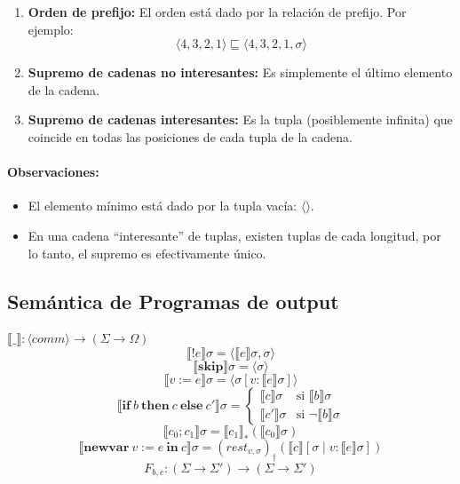 \documentclass[a4paper,11pt]{article}
\begin{document}
\begin{enumerate}
    \item \textbf{Orden de prefijo:} El orden está dado por la relación de prefijo. Por ejemplo:
    \[
    \langle 4, 3, 2, 1 \rangle \sqsubseteq \langle 4, 3, 2, 1, \sigma \rangle
    \]

    \item \textbf{Supremo de cadenas no interesantes:} Es simplemente el último elemento de la cadena.

    \item \textbf{Supremo de cadenas interesantes:} Es la tupla (posiblemente infinita) que coincide en todas las posiciones de cada tupla de la cadena.
\end{enumerate}

\paragraph{Observaciones:}
\begin{itemize}
    \item El elemento mínimo está dado por la tupla vacía: $\langle \rangle$.
    \item En una cadena ``interesante'' de tuplas, existen tuplas de cada longitud, por lo tanto, el supremo es efectivamente único.
\end{itemize}

\subsection{Semántica de Programas de output}
$\llbracket \_ \rrbracket : \langle comm \rangle \to (\Sigma \to \Omega)$
\[
\llbracket !e \rrbracket \sigma = \langle \llbracket e \rrbracket \sigma, \sigma \rangle
\]
    \[
    \llbracket \mathbf{skip} \rrbracket \sigma = \langle \sigma \rangle
    \]
    \[
    \llbracket v := e \rrbracket \sigma = \langle \sigma [v : \llbracket e \rrbracket \sigma] \rangle
    \]
    \[
    \llbracket \mathbf{if} \ b \ \mathbf{then} \ c \ \mathbf{else} \ c' \rrbracket \sigma =
    \begin{cases}
        \llbracket c \rrbracket \sigma & \text{si } \llbracket b \rrbracket \sigma \\
        \llbracket c' \rrbracket \sigma & \text{si } \neg \llbracket b \rrbracket \sigma
    \end{cases}
    \]
    \[
    \llbracket c_0; c_1 \rrbracket \sigma =
    \llbracket c_1 \rrbracket_{*} (\llbracket c_0 \rrbracket \sigma)
    \]
    \[
    \llbracket \mathbf{newvar} \ v := e \ \mathbf{in} \ c \rrbracket \sigma =
    (rest_{v,\sigma})_{\dagger} \left( \llbracket c \rrbracket [\sigma \mid v : \llbracket e \rrbracket \sigma] \right)
    \]
\[
F_{b,c} : (\Sigma \to \Sigma') \to (\Sigma \to \Sigma')
\]
\end{document}
